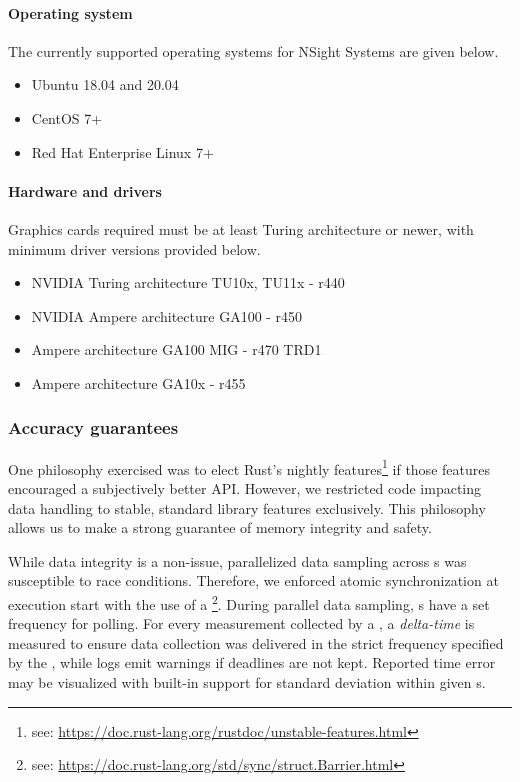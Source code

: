 \paragraph{Operating system}
The currently supported operating systems for NSight Systems are given below.
\begin{itemize}
    \item Ubuntu 18.04 and 20.04
    \item CentOS 7+
    \item Red Hat Enterprise Linux 7+
\end{itemize}

\paragraph{Hardware and drivers}
Graphics cards required must be at least Turing architecture or newer, with minimum driver versions provided below.
\begin{itemize}
    \item NVIDIA Turing architecture TU10x, TU11x - r440
    \item NVIDIA Ampere architecture GA100 - r450
    \item Ampere architecture GA100 MIG - r470 TRD1
    \item Ampere architecture GA10x - r455
\end{itemize}


\subsubsection{Accuracy guarantees}
One philosophy exercised was to elect Rust's nightly features\footnote{see: \href{https://doc.rust-lang.org/rustdoc/unstable-features.html}{https://doc.rust-lang.org/rustdoc/unstable-features.html}} if those features encouraged a subjectively better API. However, we restricted code impacting data handling to stable, standard library features exclusively. This philosophy allows us to make a strong guarantee of memory integrity and safety.\medskip

While data integrity is a non-issue, parallelized data sampling across s was susceptible to race conditions. Therefore, we enforced atomic synchronization at execution start with the use of a \footnote{see: \href{
https://doc.rust-lang.org/std/sync/struct.Barrier.html}{
https://doc.rust-lang.org/std/sync/struct.Barrier.html}}. During parallel data sampling, s have a set frequency for polling. For every measurement collected by a , a \emph{delta-time} is measured to ensure data collection was delivered in the strict frequency specified by the , while logs emit warnings if deadlines are not kept. Reported time error may be visualized with built-in support for standard deviation within given s.\medskip


